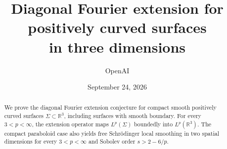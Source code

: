 \documentclass[11pt]{article}
\title{Diagonal Fourier extension for positively curved surfaces\\in three dimensions}
\author{OpenAI}
\date{September 24, 2026}
\theoremstyle{definition}
\numberwithin{equation}{section}
\newcommand{\R}{\mathbb R}
\begin{document}
\maketitle
\begin{abstract}
We prove the diagonal Fourier extension conjecture for compact smooth
positively curved surfaces \(\Sigma\subset\R^3\), including surfaces with
smooth boundary. For every \(3<p<\infty\), the extension operator maps
\(L^p(\Sigma)\) boundedly into \(L^p(\R^3)\).
The compact paraboloid case also yields free Schr\"odinger local smoothing
in two spatial dimensions for every \(3<p<\infty\) and Sobolev order
\(s>2-6/p\).
\end{abstract}









\end{document}

